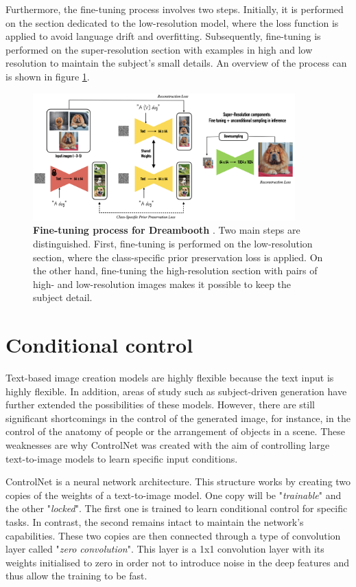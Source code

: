 Furthermore, the fine-tuning process involves two steps. Initially, it is performed on the section dedicated to the low-resolution model, where the loss function is applied to avoid language drift and overfitting. Subsequently, fine-tuning is performed on the super-resolution section with examples in high and low resolution to maintain the subject's small details. An overview of the process can is shown in figure \ref{fig:dreamboothS}.

\begin{figure}
    \centering
    \includegraphics[width=0.9\textwidth]{Pictures/dreamboothS.png} 
    \caption{\textbf{Fine-tuning process for Dreambooth} \cite{ruiz2023dreambooth}. Two main steps are distinguished. First, fine-tuning is performed on the low-resolution section, where the class-specific prior preservation loss is applied. On the other hand, fine-tuning the high-resolution section with pairs of high- and low-resolution images makes it possible to keep the subject detail.}
    \label{fig:dreamboothS}
\end{figure}

\section{Conditional control}

Text-based image creation models are highly flexible because the text input is highly flexible. In addition, areas of study such as subject-driven generation have further extended the possibilities of these models. However, there are still significant shortcomings in the control of the generated image, for instance, in the control of the anatomy of people or the arrangement of objects in a scene. These weaknesses are why ControlNet \cite{zhang2023adding} was created with the aim of controlling large text-to-image models to learn specific input conditions. 

ControlNet is a neural network architecture. This structure works by creating two copies of the weights of a text-to-image model. One copy will be "\textit{trainable}" and the other "\textit{locked}". The first one is trained to learn conditional control for specific tasks. In contrast, the second remains intact to maintain the network's capabilities. These two copies are then connected through a type of convolution layer called "\textit{zero convolution}". This layer is a 1x1 convolution layer with its weights initialised to zero in order not to introduce noise in the deep features and thus allow the training to be fast. 

